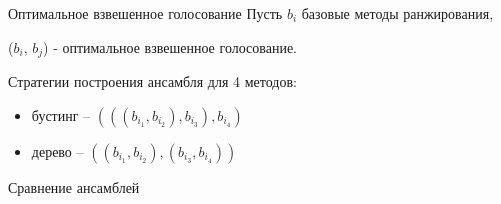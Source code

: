 \documentclass[10pt,pdf,hyperref={unicode}]{beamer}
\begin{document}
\begin{frame}{Оптимальное взвешенное голосование}
Пусть $b_i$ базовые методы ранжирования,

($b_i$, $b_j$) - оптимальное взвешенное голосование.

\bigbreak
Стратегии построения ансамбля для 4 методов:

\begin{itemize}
\item бустинг -- $(((b_{i_1}, b_{i_2}), b_{i_3}), b_{i_4})$
\item дерево -- $((b_{i_1}, b_{i_2}), (b_{i_3}, b_{i_4}))$
\end{itemize}

\end{frame}

\begin{frame}{Сравнение ансамблей}


\end{frame}
\end{document}
